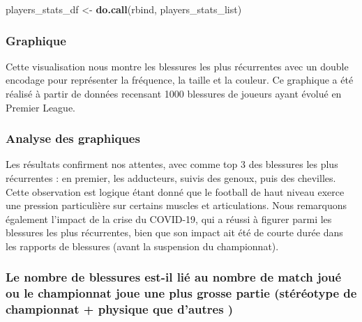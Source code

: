 \documentclass[
]{article}
\newenvironment{Shaded}{\begin{snugshade}}{\end{snugshade}}
\newcommand{\FunctionTok}[1]{\textcolor[rgb]{0.13,0.29,0.53}{\textbf{#1}}}
\newcommand{\NormalTok}[1]{#1}
\newcommand{\OtherTok}[1]{\textcolor[rgb]{0.56,0.35,0.01}{#1}}
\begin{document}
\begin{Shaded}
\begin{Highlighting}[]
\NormalTok{players\_stats\_df }\OtherTok{\textless{}{-}} \FunctionTok{do.call}\NormalTok{(rbind, players\_stats\_list)}
\end{Highlighting}
\end{Shaded}

\hypertarget{graphique}{%
\subsubsection{Graphique}\label{graphique}}

Cette visualisation nous montre les blessures les plus récurrentes avec
un double encodage pour représenter la fréquence, la taille et la
couleur. Ce graphique a été réalisé à partir de données recensant 1000
blessures de joueurs ayant évolué en Premier League.

\hypertarget{analyse-des-graphiques}{%
\subsubsection{Analyse des graphiques}\label{analyse-des-graphiques}}

Les résultats confirment nos attentes, avec comme top 3 des blessures
les plus récurrentes : en premier, les adducteurs, suivis des genoux,
puis des chevilles. Cette observation est logique étant donné que le
football de haut niveau exerce une pression particulière sur certains
muscles et articulations. Nous remarquons également l'impact de la crise
du COVID-19, qui a réussi à figurer parmi les blessures les plus
récurrentes, bien que son impact ait été de courte durée dans les
rapports de blessures (avant la suspension du championnat).

\hypertarget{le-nombre-de-blessures-est-il-liuxe9-au-nombre-de-match-jouuxe9-ou-le-championnat-joue-une-plus-grosse-partie-stuxe9ruxe9otype-de-championnat-physique-que-dautres}{%
\subsubsection{\texorpdfstring{\textbf{Le nombre de blessures est-il lié
au nombre de match joué ou le championnat joue une plus grosse partie
(stéréotype de championnat + physique que d'autres
)}}{Le nombre de blessures est-il lié au nombre de match joué ou le championnat joue une plus grosse partie (stéréotype de championnat + physique que d'autres )}}\label{le-nombre-de-blessures-est-il-liuxe9-au-nombre-de-match-jouuxe9-ou-le-championnat-joue-une-plus-grosse-partie-stuxe9ruxe9otype-de-championnat-physique-que-dautres}}
\end{document}

